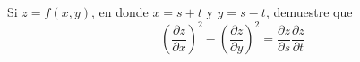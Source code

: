 \item Si $z = f(x, y)$, en donde $x = s + t$ y $y = s - t$, demuestre que
\[ \left( \frac{\partial z}{\partial x} \right)^2 - \left( \frac{\partial z}{\partial y} \right)^2 = \frac{\partial z}{\partial s} \frac{\partial z}{\partial t} \]
